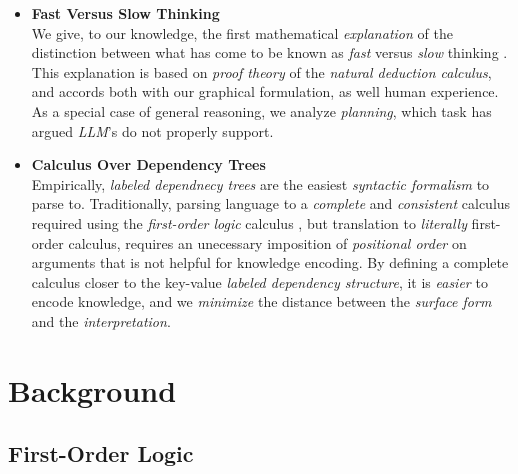 \documentclass[11pt]{article}
\newcommand{\opand}{\textbf{\em and}}
\newcommand{\opor}{\textbf{\em or}}
\begin{document}
\begin{itemize}
        In general, inference in a Bayesian Network is intractable, i.e. $\Omega(2^N)$ for $N$ random variables \cite{neapolitan2003learning}.
        Our division of Bayesian Network nodes into \opand\ and \opor\ {\em boolean  gates}, along with our use of the unguaranteed but empirically converging {\em iterative belief propagation} \cite{murphy1999loopy, smith2008dependency} means that {\em inference} can now be not only tractable, but {\em very efficient}, with one full pass of approximate belief propagation requiring only time $O(N2^n)$, where $N$ is the number of network variables involved, and $n$ bounds the number of incoming connections in any \opand\ or \opor\ gate. Moreover, we discuss why it may be possible to bring the factor computation cost to $O(n)$ instead of $O(2^n)$ for each of \opand\ and \opor.
    \item {\bf Fast Versus Slow Thinking} \\
        We give, to our knowledge, the first mathematical {\em explanation} of the distinction between what has come to be known as {\em fast} versus {\em slow} thinking \cite{Kahneman2011ThinkingFast}.
        This explanation is based on {\em proof theory} of the {\em natural deduction calculus}, and accords both with our graphical formulation, as well human experience. 
        As a special case of general reasoning, we analyze {\em planning}, which task \cite{Lecun2023} has argued {\em LLM}'s do not properly support.
    \item {\bf Calculus Over Dependency Trees} \\
        Empirically, {\em labeled dependnecy trees} are the easiest {\em syntactic formalism} to parse to.
        Traditionally, parsing language to a {\em complete} and {\em consistent} calculus required using the {\em first-order logic} calculus \cite{Steedman1996}, but translation to {\em literally} first-order calculus, requires an unecessary imposition of {\em positional order} on arguments that is not helpful for knowledge encoding.
        By defining a complete calculus closer to the key-value {\em labeled dependency structure}, it is {\em easier} to encode knowledge, and we {\em minimize} the distance between the {\em surface form} and the {\em interpretation}.
\end{itemize}
\section{Background}
\subsection{First-Order Logic}
\end{document}
